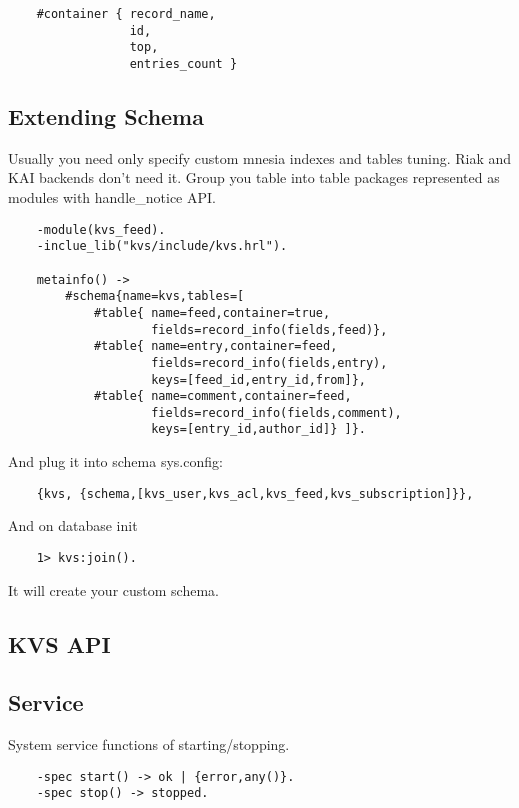\begin{lstlisting}
    #container { record_name,
                 id,
                 top,
                 entries_count }
\end{lstlisting}

\subsection{Extending Schema}

Usually you need only specify custom mnesia indexes and tables tuning.
Riak and KAI backends don't need it. Group you table into table packages
represented as modules with handle\_notice API.

\begin{lstlisting}
    -module(kvs_feed).
    -inclue_lib("kvs/include/kvs.hrl").

    metainfo() -> 
        #schema{name=kvs,tables=[
            #table{ name=feed,container=true,
                    fields=record_info(fields,feed)},
            #table{ name=entry,container=feed,
                    fields=record_info(fields,entry),
                    keys=[feed_id,entry_id,from]},
            #table{ name=comment,container=feed,
                    fields=record_info(fields,comment),
                    keys=[entry_id,author_id]} ]}.
\end{lstlisting}

And plug it into schema sys.config:

\begin{lstlisting}
    {kvs, {schema,[kvs_user,kvs_acl,kvs_feed,kvs_subscription]}},
\end{lstlisting}

And on database init

\begin{lstlisting}
    1> kvs:join().
\end{lstlisting}

It will create your custom schema.

\subsection{KVS API}

\subsection{Service}
System service functions of starting/stopping.

\vspace{1\baselineskip}
\begin{lstlisting}
    -spec start() -> ok | {error,any()}.
    -spec stop() -> stopped.
\end{lstlisting}
\vspace{1\baselineskip}

